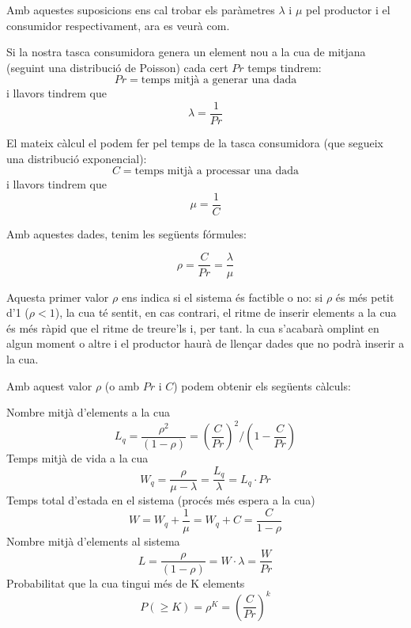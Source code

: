 Amb aquestes suposicions ens cal trobar els paràmetres $\lambda$ i $\mu$ pel productor i el consumidor respectivament, ara es veurà com.

Si la nostra tasca consumidora genera un element nou a la cua de mitjana (seguint una distribució de Poisson) cada cert $Pr$ temps tindrem:
\begin{equation}
 Pr = \text {temps mitjà a generar una dada}
\end{equation}
i llavors tindrem que
\begin{equation}
 \lambda = \frac{1}{Pr}
\end{equation}

El mateix càlcul el podem fer pel temps de la tasca consumidora (que segueix una distribució exponencial):
\begin{equation}
C = \text {temps mitjà a processar una dada}
\end{equation}
i llavors tindrem que
\begin{equation}
 \mu = \frac{1}{C}
\end{equation}

Amb aquestes dades, tenim les següents fórmules:

\begin{equation}
 \rho = \frac{C}{Pr} = \frac{\lambda}{\mu}
\end{equation}

Aquesta primer valor $\rho$ ens indica si el sistema és factible o no: si $\rho$ és més petit d'1 ($\rho < 1$), la cua té sentit, en cas contrari, el ritme de inserir elements a la cua és més ràpid que el ritme de treure'ls i, per tant. la cua s'acabarà omplint en algun moment o altre i el productor haurà de llençar dades que no podrà inserir a la cua.

Amb aquest valor $\rho$ (o amb $Pr$ i $C$) podem obtenir els següents càlculs:

Nombre mitjà d'elements a la cua
\begin{equation}
 L_q = \frac{\rho^2}{(1-\rho)}  = \left( \frac{C}{Pr} \right)^2 /  \left( 1 - \frac{C}{Pr}\right)
\end{equation}
Temps mitjà de vida a la cua
\begin{equation}
 W_q =  \frac{\rho}{\mu - \lambda} = \frac{L_q}{\lambda} = L_q \cdot Pr
\end{equation}
Temps total d'estada en el sistema (procés més espera a la cua)
\begin{equation}
 W = W_q + \frac{1}{\mu} = W_q +C = \frac{C}{1-\rho}
\end{equation}
Nombre mitjà d'elements al sistema
\begin{equation}
 L = \frac{\rho}{(1-\rho)}  = W \cdot \lambda = \frac{W}{Pr}
\end{equation}
Probabilitat que la cua tingui més de K elements
\begin{equation}
\label{eq:Prob_queue_full}
 P(\geqslant K) = \rho^K =  \left( \frac{C}{Pr} \right)^k 
\end{equation}

